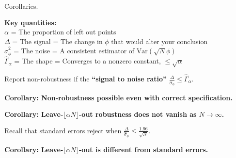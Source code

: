
\begin{frame}{Corollaries.}

{\small
\textbf{Key quantities:}\\
\pause $\alpha$  = The proportion of left out points\\
\pause $\Delta$  = The signal = The change in $\phi$ that would alter your
conclusion\\
\pause $\hat\sigma_\phi^2$ = The noise = A consistent estimator of
$\mathrm{Var}(\sqrt{N}\phi)$\\
\pause $\hat\Gamma_\alpha$ =
The shape = Converges to a nonzero constant, $\le \sqrt{\alpha}$\\
}

\pause
Report non-robustness if the \textbf{``signal to noise ratio''}
$\frac{\Delta}{\hat\sigma_\phi} \le \hat\Gamma_\alpha$.


\pause
\vspace{0.5em}
\textbf{Corollary:  Non-robustness possible even with correct specification.}
\vspace{-0.4em}

\pause
\vspace{0.5em}
\textbf{Corollary:  Leave-$\lfloor \alpha N \rfloor$-out robustness does not vanish as $N \rightarrow \infty$.}
%

\pause
\vspace{0.5em}
Recall that standard errors reject when
$\frac{\Delta}{\hat\sigma_\phi} \le \frac{1.96}{\sqrt{N}}$.

\pause
\vspace{0.5em}
\textbf{Corollary:  Leave-$\lfloor \alpha N \rfloor$-out is different from standard errors.}

%


\end{frame}



